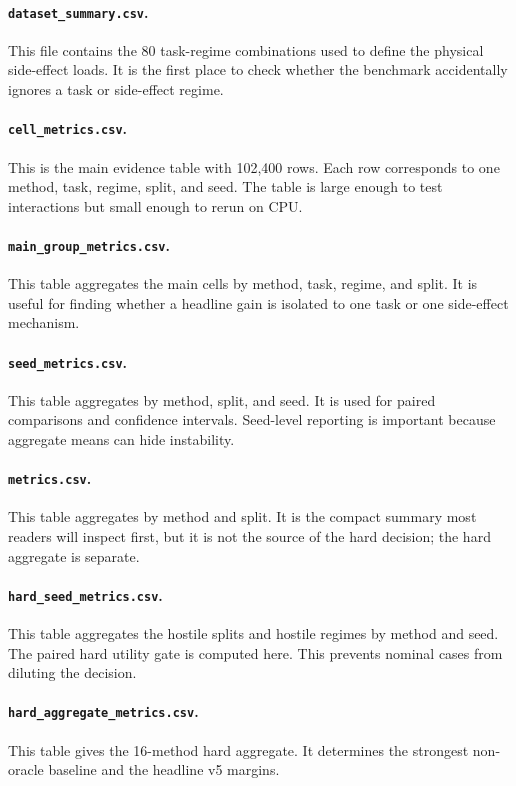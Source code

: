 \documentclass{article}
\begin{document}
\paragraph{\texttt{dataset\_summary.csv}.}
This file contains the 80 task-regime combinations used to define the physical side-effect loads. It is the first place to check whether the benchmark accidentally ignores a task or side-effect regime.

\paragraph{\texttt{cell\_metrics.csv}.}
This is the main evidence table with 102,400 rows. Each row corresponds to one method, task, regime, split, and seed. The table is large enough to test interactions but small enough to rerun on CPU.

\paragraph{\texttt{main\_group\_metrics.csv}.}
This table aggregates the main cells by method, task, regime, and split. It is useful for finding whether a headline gain is isolated to one task or one side-effect mechanism.

\paragraph{\texttt{seed\_metrics.csv}.}
This table aggregates by method, split, and seed. It is used for paired comparisons and confidence intervals. Seed-level reporting is important because aggregate means can hide instability.

\paragraph{\texttt{metrics.csv}.}
This table aggregates by method and split. It is the compact summary most readers will inspect first, but it is not the source of the hard decision; the hard aggregate is separate.

\paragraph{\texttt{hard\_seed\_metrics.csv}.}
This table aggregates the hostile splits and hostile regimes by method and seed. The paired hard utility gate is computed here. This prevents nominal cases from diluting the decision.

\paragraph{\texttt{hard\_aggregate\_metrics.csv}.}
This table gives the 16-method hard aggregate. It determines the strongest non-oracle baseline and the headline v5 margins.
\end{document}
